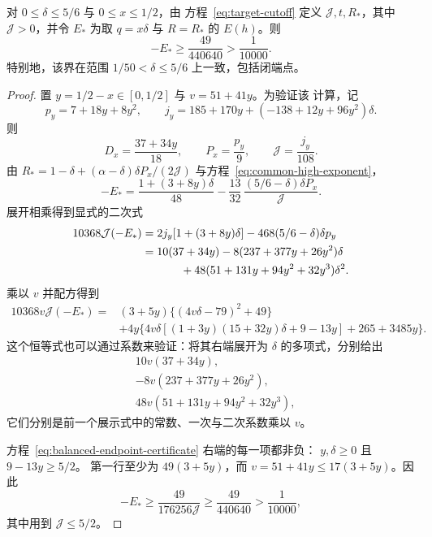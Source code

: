 \begin{lemma}[补偿后的端点证书]\label{lem:balanced-endpoint}
对 \(0\le\delta\le5/6\) 与 \(0\le x\le1/2\)，由
方程~\eqref{eq:target-cutoff} 定义 \(\mathcal J,t,R_*\)，其中
\(\mathcal J>0\)，并令 \(E_*\) 为取
\(q=x\delta\) 与 \(R=R_*\) 的 \(E(h)\)。则
\[
 -E_*\ge\frac{49}{440640}>\frac1{10000}.
\]
特别地，该界在范围
\(1/50<\delta\le5/6\) 上一致，包括闭端点。
\end{lemma}

\begin{proof}
置 \(y=1/2-x\in[0,1/2]\) 与 \(v=51+41y\)。为验证该
计算，记
\[
 p_y=7+18y+8y^2,\qquad
 j_y=185+170y+(-138+12y+96y^2)\delta.
\]
则
\[
 D_x=\frac{37+34y}{18},\qquad
 P_x=\frac{p_y}{9},\qquad
 \mathcal J=\frac{j_y}{108}.
\]
由 \(R_*=1-\delta+(\alpha-\delta)\delta P_x/(2\mathcal J)\)
与方程~\eqref{eq:common-high-exponent}，
\[
 -E_*=
 \frac{1+(3+8y)\delta}{48}
 -\frac{13}{32}\,
   \frac{(5/6-\delta)\delta P_x}{\mathcal J}.
\]
展开相乘得到显式的二次式
\[
 \begin{split}
 10368\mathcal J(-E_*)
 &=2j_y[1+(3+8y)\delta]
     -468(5/6-\delta)\delta p_y\\
 &=10(37+34y)
   -8(237+377y+26y^2)\delta\\
 &\hspace{12mm}
   +48(51+131y+94y^2+32y^3)\delta^2.
 \end{split}
\]
乘以 \(v\) 并配方得到
\begin{equation}
 \begin{aligned}
 10368v\mathcal J(-E_*)
 ={}&(3+5y)\bigl\{(4v\delta-79)^2+49\bigr\}\\
 &+4y\bigl\{
 4v\delta[(1+3y)(15+32y)\delta+9-13y]
       +265+3485y\bigr\}.
 \end{aligned}
 \label{eq:balanced-endpoint-certificate}
\end{equation}
这个恒等式也可以通过系数来验证：将其右端展开为
\(\delta\) 的多项式，分别给出
\[
 \begin{split}
 &10v(37+34y),\\
 &-8v(237+377y+26y^2),\\
 &48v(51+131y+94y^2+32y^3),
 \end{split}
\]
它们分别是前一个展示式中的常数、一次与二次系数乘以 \(v\)。

方程~\eqref{eq:balanced-endpoint-certificate} 右端的每一项都非负：
\(y,\delta\ge0\) 且 \(9-13y\ge5/2\)。
第一行至少为 \(49(3+5y)\)，而
\(v=51+41y\le17(3+5y)\)。因此
\[
 -E_*\ge\frac{49}{176256\mathcal J}
       \ge\frac{49}{440640}>\frac1{10000},
\]
其中用到 \(\mathcal J\le5/2\)。
\end{proof}

